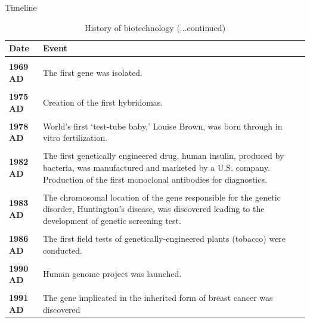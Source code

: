 \documentclass[
  ignorenonframetext,
  aspectratio=169]{beamer}
\begin{document}
\begin{frame}{Timeline}
\protect\hypertarget{timeline-1}{}
\begin{table}

\caption{\label{tab:biotechnology-history2}History of biotechnology (...continued)}
\centering
\fontsize{5}{7}\selectfont
\begin{tabular}[t]{>{}l>{\raggedright\arraybackslash}p{40em}}
\toprule
Date & Event\\
\midrule
\textbf{\cellcolor{gray!6}{1961 AD}} & \cellcolor{gray!6}{Deciphering of genetic code by M.Nirenberg and H.G. Khorana.}\\
\textbf{1969 AD} & The first gene was isolated.\\
\textbf{\cellcolor{gray!6}{1973 AD}} & \cellcolor{gray!6}{The first genetic engineering experiment was carried out by Walter Gilbert.}\\
\textbf{1975 AD} & Creation of the first hybridomas.\\
\textbf{\cellcolor{gray!6}{1976 AD}} & \cellcolor{gray!6}{The first biotech company.}\\
\addlinespace
\textbf{1978 AD} & World’s first ‘test-tube baby,’ Louise Brown, was born through in vitro fertilization.\\
\textbf{\cellcolor{gray!6}{1981 AD}} & \cellcolor{gray!6}{The first gene was synthesized. The first DNA synthesizer was developed.}\\
\textbf{1982 AD} & The first genetically engineered drug, human insulin, produced by bacteria, was manufactured and marketed by a U.S. company. Production of the first monoclonal antibodies for diagnostics.\\
\textbf{\cellcolor{gray!6}{1983 AD}} & \cellcolor{gray!6}{The first transgenic plant was created—a petunia plant was genetically engineered to be resistant to kanamycin, an antibiotic.}\\
\textbf{1983 AD} & The chromosomal location of the gene responsible for the genetic disorder, Huntington’s disease, was discovered leading to the development of genetic screening test.\\
\addlinespace
\textbf{\cellcolor{gray!6}{1985 AD}} & \cellcolor{gray!6}{DNA fingerprinting was first used in a criminal investigation.}\\
\textbf{1986 AD} & The first field tests of genetically-engineered plants (tobacco) were conducted.\\
\textbf{\cellcolor{gray!6}{1990 AD}} & \cellcolor{gray!6}{Chymosin, an enzyme used in cheese making, became the first product of genetic engineering to be introduced into the food supply}\\
\textbf{1990 AD} & Human genome project was launched.\\
\textbf{\cellcolor{gray!6}{1990 AD}} & \cellcolor{gray!6}{The first human gene therapy trial was performed on a four-year-old girl with an immune disorder.}\\
\addlinespace
\textbf{1991 AD} & The gene implicated in the inherited form of breast cancer was discovered\\
\bottomrule
\end{tabular}
\end{table}
\end{frame}
\end{document}
